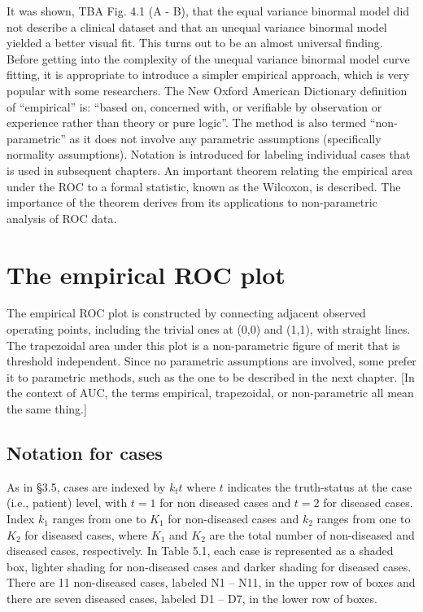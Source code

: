 \documentclass[
]{book}
\begin{document}
It was shown, TBA Fig. 4.1 (A - B), that the equal variance binormal model did not describe a clinical dataset and that an unequal variance binormal model yielded a better visual fit. This turns out to be an almost universal finding. Before getting into the complexity of the unequal variance binormal model curve fitting, it is appropriate to introduce a simpler empirical approach, which is very popular with some researchers. The New Oxford American Dictionary definition of ``empirical'' is: ``based on, concerned with, or verifiable by observation or experience rather than theory or pure logic''. The method is also termed ``non-parametric'' as it does not involve any parametric assumptions (specifically normality assumptions). Notation is introduced for labeling individual cases that is used in subsequent chapters. An important theorem relating the empirical area under the ROC to a formal statistic, known as the Wilcoxon, is described. The importance of the theorem derives from its applications to non-parametric analysis of ROC data.

\hypertarget{empirical-roc-plot}{%
\section{The empirical ROC plot}\label{empirical-roc-plot}}

The empirical ROC plot is constructed by connecting adjacent observed operating points, including the trivial ones at (0,0) and (1,1), with straight lines. The trapezoidal area under this plot is a non-parametric figure of merit that is threshold independent. Since no parametric assumptions are involved, some prefer it to parametric methods, such as the one to be described in the next chapter. {[}In the context of AUC, the terms empirical, trapezoidal, or non-parametric all mean the same thing.{]}

\hypertarget{notation-for-cases}{%
\subsection{Notation for cases}\label{notation-for-cases}}

As in §3.5, cases are indexed by \(k_tt\) where \(t\) indicates the truth-status at the case (i.e., patient) level, with \(t=1\) for non diseased cases and \(t=2\) for diseased cases. Index \(k_1\) ranges from one to \(K_1\) for non-diseased cases and \(k_2\) ranges from one to \(K_2\) for diseased cases, where \(K_1\) and \(K_2\) are the total number of non-diseased and diseased cases, respectively. In Table 5.1, each case is represented as a shaded box, lighter shading for non-diseased cases and darker shading for diseased cases. There are 11 non-diseased cases, labeled N1 -- N11, in the upper row of boxes and there are seven diseased cases, labeled D1 -- D7, in the lower row of boxes.
\end{document}
